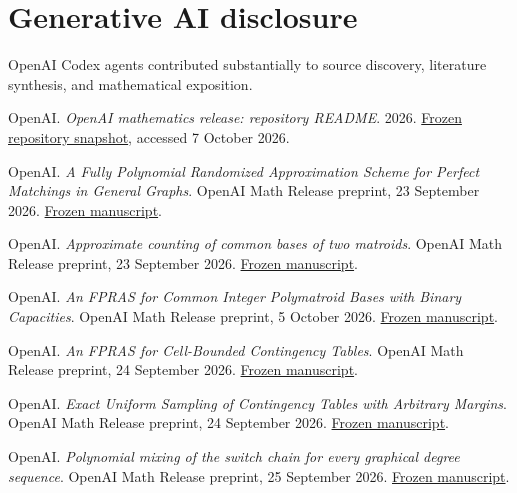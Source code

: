\documentclass[11pt]{article}
\newcommand{\repourl}[2]{\href{https://github.com/openai/math/blob/adc7f1241b42e322a6451854ab7e4b4c146bf78a/#1}{#2}}
\begin{document}
\section*{Generative AI disclosure}
OpenAI Codex agents contributed substantially to source discovery, literature synthesis, and mathematical exposition.

\begin{thebibliography}{99}
OpenAI.
\emph{OpenAI mathematics release: repository README}.
2026.
\repourl{README.md}{Frozen repository snapshot}, accessed 7 October 2026.

OpenAI.
\emph{A Fully Polynomial Randomized Approximation Scheme for Perfect Matchings in General Graphs}.
OpenAI Math Release preprint, 23 September 2026.
\repourl{preprints/A-Fully-Polynomial-Randomized-Approximation-Scheme-for-Perfect-Matchings-in-General-Graphs-September-23-2026/main.pdf}{Frozen manuscript}.

OpenAI.
\emph{Approximate counting of common bases of two matroids}.
OpenAI Math Release preprint, 23 September 2026.
\repourl{preprints/Approximate-counting-of-common-bases-of-two-matroids-September-23-2026/main.pdf}{Frozen manuscript}.

OpenAI.
\emph{An FPRAS for Common Integer Polymatroid Bases with Binary Capacities}.
OpenAI Math Release preprint, 5 October 2026.
\repourl{preprints/An-FPRAS-for-Common-Integer-Polymatroid-Bases-with-Binary-Capacities-October-5-2026/polymatroid-fpras.pdf}{Frozen manuscript}.

OpenAI.
\emph{An FPRAS for Cell-Bounded Contingency Tables}.
OpenAI Math Release preprint, 24 September 2026.
\repourl{preprints/An-FPRAS-for-Cell-Bounded-Contingency-Tables-September-24-2026/main.pdf}{Frozen manuscript}.

OpenAI.
\emph{Exact Uniform Sampling of Contingency Tables with Arbitrary Margins}.
OpenAI Math Release preprint, 24 September 2026.
\repourl{preprints/Exact-Uniform-Sampling-of-Contingency-Tables-with-Arbitrary-Margins-September-24-2026/main.pdf}{Frozen manuscript}.

OpenAI.
\emph{Polynomial mixing of the switch chain for every graphical degree sequence}.
OpenAI Math Release preprint, 25 September 2026.
\repourl{preprints/Polynomial-Mixing-of-the-Switch-Chain-for-Every-Graphical-Degree-Sequence-September-25-2026/main.pdf}{Frozen manuscript}.


\end{thebibliography}
\end{document}
